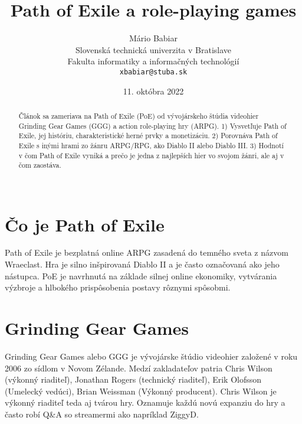 \documentclass[10pt,twoside,slovak,a4paper]{article}
\title{Path of Exile a role-playing games}
\author{Mário Babiar\\[2pt]
	{\small Slovenská technická univerzita v Bratislave}\\
	{\small Fakulta informatiky a informačných technológií}\\
	{\small \texttt{xbabiar@stuba.sk}}
	}
\date{\small 11. októbra 2022}
\begin{document}
\maketitle

\begin{abstract}
Článok sa zameriava na Path of Exile (PoE) od vývojárskeho štúdia videohier Grinding Gear Games (GGG) a action role-playing hry (ARPG). 1) Vysvetľuje Path of Exile, jej históriu, charakteristické herné prvky a monetizáciu. 2) Porovnáva Path of Exile s inými hrami zo žánru ARPG/RPG, ako Diablo II alebo Diablo III. 3) Hodnotí v čom Path of Exile vyniká a prečo je jedna z najlepších hier vo svojom žánri, ale aj v čom zaostáva.\\\\
\end{abstract}
 
\section{Čo je Path of Exile}
Path of Exile je bezplatná online ARPG zasadená do temného sveta z názvom Wraeclast. Hra je silno inšpirovaná Diablo II a je často označovaná ako jeho nástupca. PoE je navrhnutá na základe silnej online ekonomiky, vytvárania výzbroje a hlbokého prispôsobenia postavy rôznymi spôsobmi.

\section{Grinding Gear Games}
Grinding Gear Games alebo GGG je vývojárske štúdio videohier založené v roku 2006 zo sídlom v Novom Zélande. Medzí zakladateľov patria Chris Wilson (výkonný riaditeľ), Jonathan Rogers (technický riaditeľ), Erik Olofsson (Umelecký vedúci), Brian Weissman (Výkonný producent). Chris Wilson je výkonný riaditeľ teda aj tvárou hry. Oznamuje každú novú expanziu do hry a často robí Q\&A so streamermi ako napríklad ZiggyD.
\end{document}
